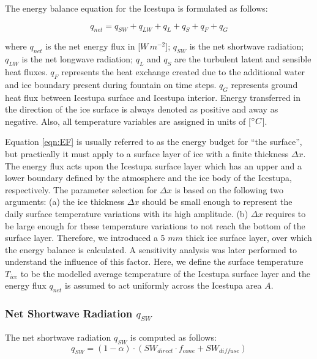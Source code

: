 \documentclass[utf8]{frontiersSCNS} %
\begin{document}
The energy balance equation for the Icestupa is formulated as follows:

\begin{equation}
q_{net} = q_{SW} + q_{LW} + q_{L} + q_{S} + q_{F} + q_{G}
\label{eqn:EF}
\end{equation}

where $q_{net}$ is the net energy flux in [$W\,m^{-2}$]; $q_{SW}$ is the net
shortwave radiation; $q_{LW}$ is the net longwave radiation; $q_{L}$ and
$q_{S}$ are the turbulent latent and sensible heat fluxes. $q_{F}$ represents
the heat exchange created due to the additional water and ice boundary present
during fountain on time steps. $q_{G}$ represents ground heat flux between
Icestupa surface and Icestupa interior. Energy transferred in the direction of
the ice surface is always denoted as positive and away as negative. Also, all
temperature variables are assigned in units of [$\degree C$]. 

Equation \ref{eqn:EF} is usually referred to as the energy budget for “the
surface”, but practically it must apply to a surface layer of ice with a
finite thickness $\Delta x$. The energy flux acts upon the Icestupa surface
layer which has an upper and a lower boundary defined by the atmosphere and
the ice body of the Icestupa, respectively. The parameter selection for
$\Delta x$ is based on the following two arguments: (a) the ice thickness
$\Delta x$ should be small enough to represent the daily surface temperature
variations with its high amplitude. (b) $\Delta x$ requires to be large enough
for these temperature variations to not reach the bottom of the surface layer.
Therefore, we introduced a 5 $mm$ thick ice surface layer, over which the
energy balance is calculated. A sensitivity analysis was later performed to
understand the influence of this factor. Here, we define the surface
temperature $T_{ice}$ to be the modelled average temperature of the Icestupa
surface layer and the energy flux $q_{net}$ is assumed to act uniformly across
the Icestupa area $A$.

\subsubsection{Net Shortwave Radiation $q_{SW}$} The net shortwave radiation
$q_{SW}$ is computed as follows: \begin{equation} q_{SW} = (1- \alpha)\cdot
  (SW_{direct} \cdot f_{cone} + SW_{diffuse}) \label{eqn:SW}
\end{equation}
\end{document}
